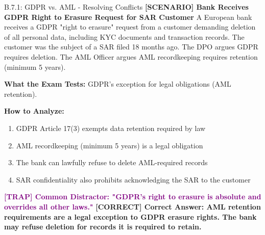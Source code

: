 \documentclass[11pt,a4paper]{beamer}
\newcommand{\trap}[1]{\textcolor{purple}{\textbf{[TRAP] #1}}}
\newcommand{\correct}[1]{\textcolor{green!50!black}{\textbf{[CORRECT] #1}}}
\newcommand{\scenario}[1]{\textcolor{blue!70!black}{\textbf{[SCENARIO] #1}}}
\begin{document}
	\begin{frame}{B.7.1: GDPR vs. AML - Resolving Conflicts}
		\scenario{Bank Receives GDPR Right to Erasure Request for SAR Customer}
		A European bank receives a GDPR "right to erasure" request from a customer demanding deletion of all personal data, including KYC documents and transaction records. The customer was the subject of a SAR filed 18 months ago. The DPO argues GDPR requires deletion. The AML Officer argues AML recordkeeping requires retention (minimum 5 years).
		
		\vspace{0.1cm}
		\textbf{What the Exam Tests:} GDPR's exception for legal obligations (AML retention).
		
		\vspace{0.1cm}
		\textbf{How to Analyze:}
		\begin{enumerate}
			\item GDPR Article 17(3) exempts data retention required by law
			\item AML recordkeeping (minimum 5 years) is a legal obligation
			\item The bank can lawfully refuse to delete AML-required records
			\item SAR confidentiality also prohibits acknowledging the SAR to the customer
		\end{enumerate}
		
		\trap{Common Distractor: "GDPR's right to erasure is absolute and overrides all other laws."}
		\correct{Correct Answer: AML retention requirements are a legal exception to GDPR erasure rights. The bank may refuse deletion for records it is required to retain.}
	\end{frame}
	
	
\end{document}
